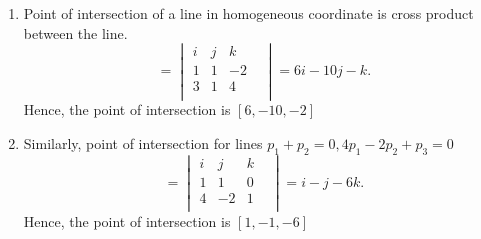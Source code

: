 \documentclass[11pt]{article}
\begin{document}
\begin{enumerate}
\begin{tcolorbox}
\begin{enumerate}[]
\color{blue}
\item
{ Point of intersection of a line in homogeneous coordinate is cross product between the line.\\
\begin{equation*}
=
    \begin{vmatrix}
        i & j & k & \\ 
        1 & 1 & -2\\
        3 & 1 & 4\\
    \end{vmatrix} = 6i-10j-k. 
\end{equation*}
Hence, the point of intersection is $[6,-10,-2]$
}
  \item
  Similarly, point of intersection for lines $p_1 + p_2 = 0, 4p_1 - 2p_2 + p_3 = 0$
\begin{equation*}
=
    \begin{vmatrix}
        i & j & k & \\ 
        1 & 1 & 0\\
        4 & -2 & 1\\
    \end{vmatrix} = i-j-6k. 
\end{equation*}
Hence, the point of intersection is $[1,-1,-6]$
  \end{enumerate}


\end{tcolorbox}
\end{enumerate}
\end{document}
